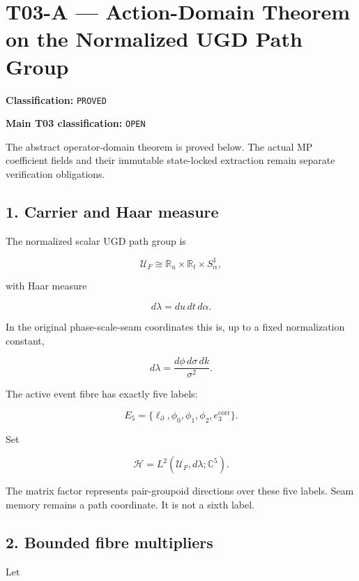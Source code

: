 \hypertarget{t03-a-action-domain-theorem-on-the-normalized-ugd-path-group}{%
\chapter{T03-A --- Action-Domain Theorem on the Normalized UGD Path Group}\label{t03-a-action-domain-theorem-on-the-normalized-ugd-path-group}}

\textbf{Classification:} \texttt{PROVED}

\textbf{Main T03 classification:} \texttt{OPEN}

The abstract operator-domain theorem is proved below. The actual MP coefficient
fields and their immutable state-locked extraction remain separate verification
obligations.

\hypertarget{carrier-and-haar-measure}{%
\section{1. Carrier and Haar measure}\label{carrier-and-haar-measure}}

The normalized scalar UGD path group is

\[
\mathcal U_F
\cong
\mathbb R_u\times\mathbb R_t\times S^1_\alpha,
\]

with Haar measure

\[
d\lambda=du\,dt\,d\alpha.
\]

In the original phase-scale-seam coordinates this is, up to a fixed
normalization constant,

\[
d\lambda
=
\frac{d\phi\,d\sigma\,dk}{\sigma^2}.
\]

The active event fibre has exactly five labels:

\[
E_5=
\{\ell_\partial,\phi_0,\phi_1,\phi_2,e_3^{\mathrm{corr}}\}.
\]

Set

\[
\mathcal H
=
L^2(\mathcal U_F,d\lambda;\mathbb C^5).
\]

The matrix factor represents pair-groupoid directions over these five labels.
Seam memory remains a path coordinate. It is not a sixth label.

\hypertarget{bounded-fibre-multipliers}{%
\section{2. Bounded fibre multipliers}\label{bounded-fibre-multipliers}}

Let

